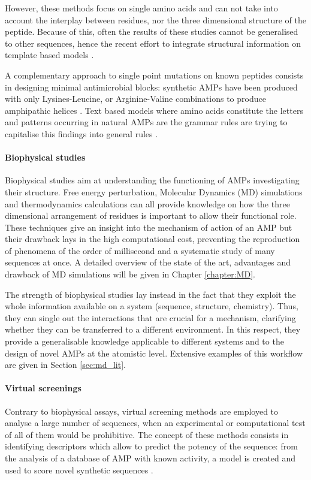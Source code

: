 However, these methods focus on single amino acids and can not take into account the interplay between residues, nor the three dimensional structure of the peptide. Because of this, often the results of these studies cannot be generalised to other sequences, hence the recent effort to integrate structural information on template based models \citep{Liu2018,Jiang2011}.

A complementary approach to single point mutations on known peptides consists in designing minimal antimicrobial blocks: synthetic AMPs have been produced with only Lysines-Leucine, or Arginine-Valine combinations to produce amphipathic helices \citep{Deslouches2005}.
%
Text based models where amino acids constitute the letters and patterns occurring in natural AMPs are the grammar rules are trying to capitalise this findings into general rules \citep{Loose2006,Cipcigan2018,Spanig2019}.


\paragraph{Biophysical studies}
Biophysical studies aim at understanding the functioning of AMPs investigating their structure. Free energy perturbation, Molecular Dynamics (MD) simulations and thermodynamics calculations can all provide knowledge on how the three dimensional arrangement of residues is important to allow their functional role.
%
These techniques give an insight into the mechanism of action of an AMP but their drawback lays in the high computational cost, preventing the reproduction of phenomena of the order of millisecond and a systematic study of many sequences at once. A detailed overview of the state of the art, advantages and drawback of MD simulations will be given in Chapter \ref{chapter:MD}.

The strength of biophysical studies lay instead in the fact that they exploit the whole information available on a system (sequence, structure, chemistry). Thus, they can single out the interactions that are crucial for a mechanism, clarifying whether they can be transferred to a different environment. In this respect, they provide a generalisable knowledge applicable to different systems and to the design of novel AMPs at the atomistic level. Extensive examples of this workflow are given in Section \ref{sec:md_lit}.


\paragraph{Virtual screenings}
Contrary to biophysical assays, virtual screening methods are employed to analyse a large number of sequences, when an experimental or computational test of all of them would be prohibitive. The concept of these methods consists in identifying descriptors which allow to predict the potency of the sequence: from the analysis of a database of AMP with known activity, a model is created and used to score novel synthetic sequences \citep{Fjell2011,Kleandrova2016}.

